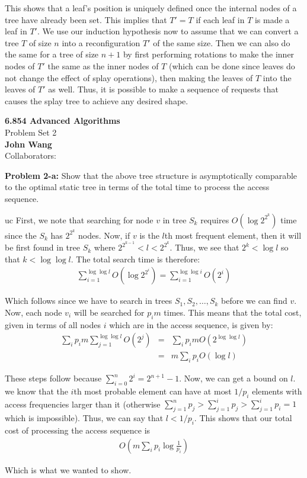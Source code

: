\documentclass[psamsfonts]{amsart}
\newenvironment{sol}{\vspace{0.25cm}{\large \bfseries Solution:}}{\qedsymbol}
\newenvironment{prob}[1]{\begin{framed}{\large \bfseries Problem #1:}}{\end{framed}}
\newcommand{\makenewtitle}{
\begin{center}
{\huge \bfseries 6.854 Advanced Algorithms} \\
Problem Set 2\\
\vspace{0.25cm}
{\bfseries John Wang} \\
Collaborators:
\end{center}
\vspace{0.5cm}
}
\begin{document}
\begin{sol}
This shows that a leaf's position is uniquely defined once the internal nodes of a tree have already been set. This implies that $T' = T$ if each leaf in $T$ is made a leaf in $T'$. We use our induction hypothesis now to assume that we can convert a tree $T$ of size $n$ into a reconfiguration $T'$ of the same size. Then we can also do the same for a tree of size $n+1$ by first performing rotations to make the inner nodes of $T'$ the same as the inner nodes of $T$ (which can be done since leaves do not change the effect of splay operations), then making the leaves of $T$ into the leaves of $T'$ as well. Thus, it is possible to make a sequence of requests that causes the splay tree to achieve any desired shape.
\end{sol}

\newpage

\makenewtitle

\begin{prob}{2-a}
Show that the above tree structure is asymptotically comparable to the optimal static tree in terms of the total time to process the access sequence.
\end{prob}

uc\begin{sol}
First, we note that searching for node $v$ in tree $S_k$ requires $O(\log 2^{2^k})$ time since the $S_k$ has $2^{2^k}$ nodes. Now, if $v$ is the $l$th most frequent element, then it will be first found in tree $S_k$ where $2^{2^{k-1}} < l < 2^{2^{k}}$. Thus, we see that $2^k < \log l$ so that $k < \log \log l$. The total search time is therefore:
\begin{eqnarray}
\sum_{i=1}^{\log \log l} O(\log 2^{2^i}) = \sum_{i=1}^{\log \log i} O(2^i)
\end{eqnarray}

Which follows since we have to search in trees $S_1, S_2, \ldots, S_k$ before we can find $v$. Now, each node $v_i$ will be searched for $p_i m$ times. This means that the total cost, given in terms of all nodes $i$ which are in the access sequence, is given by:
\begin{eqnarray}
\sum_{i} p_i m \sum_{j=1}^{\log \log l} O(2^j) &=& \sum_{i} p_i m O(2^{\log \log l}) \\
&=& m \sum_{i} p_i O(\log l) 
\end{eqnarray}

These steps follow because $\sum_{i=0}^n 2^i = 2^{n+1} - 1$. Now, we can get a bound on $l$. we know that the $i$th most probable element can have at most $1/p_i$ elements with access frequencies larger than it (otherwise $\sum_{j=1}^n p_j > \sum_{j=1}^i p_j > \sum_{j=1}^i p_i = 1$ which is impossible). Thus, we can say that $l < 1/p_i$. This shows that our total cost of processing the access sequence is 
\begin{eqnarray}
O \left( m \sum_{i} p_i \log \frac{1}{p_i} \right)
\end{eqnarray}

Which is what we wanted to show.
\end{sol}
\end{document}
